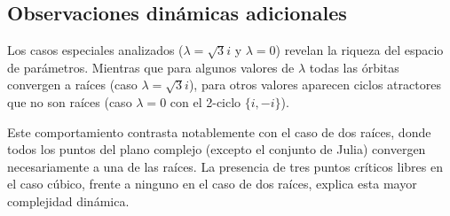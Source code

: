 \subsection{Observaciones dinámicas adicionales}

Los casos especiales analizados ($\lambda=\sqrt{3}i$ y $\lambda=0$) revelan la riqueza del espacio de parámetros. Mientras que para algunos valores de $\lambda$ todas las órbitas convergen a raíces (caso $\lambda=\sqrt{3}i$), para otros valores aparecen ciclos atractores que no son raíces (caso $\lambda=0$ con el 2-ciclo $\{i,-i\}$).

Este comportamiento contrasta notablemente con el caso de dos raíces, donde todos los puntos del plano complejo (excepto el conjunto de Julia) convergen necesariamente a una de las raíces. La presencia de tres puntos críticos libres en el caso cúbico, frente a ninguno en el caso de dos raíces, explica esta mayor complejidad dinámica.









